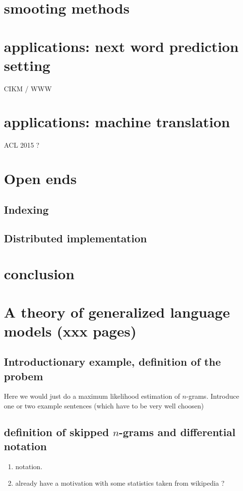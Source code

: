 \documentclass[•]{book}
\begin{document}
\chapter{smooting methods}
\chapter{applications: next word prediction setting}
CIKM / WWW
\chapter{applications: machine translation}
ACL 2015 ?
\chapter{Open ends}
\section{Indexing}
\section{Distributed implementation}
\chapter{conclusion}



\chapter{A theory of generalized language models (xxx pages)}
\section{Introductionary example, definition of the probem}
Here we would just do a maximum likelihood estimation of $n$-grams. 
Introduce one or two example sentences (which have to be very well choosen)
\section{definition of skipped $n$-grams and differential notation}
\begin{enumerate}
\item notation. 
\item already have a motivation with some statistics taken from wikipedia ? 
\end{enumerate}
\end{document}
